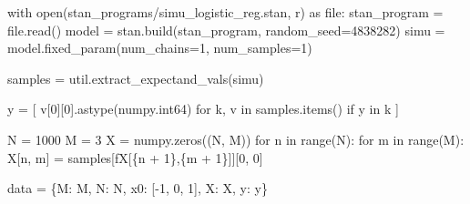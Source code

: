 \documentclass[
  letterpaper,
  DIV=11,
  numbers=noendperiod]{scrartcl}
\newenvironment{Shaded}{\begin{snugshade}}{\end{snugshade}}
\newcommand{\BuiltInTok}[1]{\textcolor[rgb]{0.00,0.23,0.31}{#1}}
\newcommand{\ControlFlowTok}[1]{\textcolor[rgb]{0.00,0.23,0.31}{#1}}
\newcommand{\DecValTok}[1]{\textcolor[rgb]{0.68,0.00,0.00}{#1}}
\newcommand{\ImportTok}[1]{\textcolor[rgb]{0.00,0.46,0.62}{#1}}
\newcommand{\KeywordTok}[1]{\textcolor[rgb]{0.00,0.23,0.31}{#1}}
\newcommand{\NormalTok}[1]{\textcolor[rgb]{0.00,0.23,0.31}{#1}}
\newcommand{\OperatorTok}[1]{\textcolor[rgb]{0.37,0.37,0.37}{#1}}
\newcommand{\SpecialCharTok}[1]{\textcolor[rgb]{0.37,0.37,0.37}{#1}}
\newcommand{\SpecialStringTok}[1]{\textcolor[rgb]{0.13,0.47,0.30}{#1}}
\newcommand{\StringTok}[1]{\textcolor[rgb]{0.13,0.47,0.30}{#1}}
\begin{document}
\begin{Shaded}
\begin{Highlighting}[]
\ControlFlowTok{with} \BuiltInTok{open}\NormalTok{(}\StringTok{\textquotesingle{}stan\_programs/simu\_logistic\_reg.stan\textquotesingle{}}\NormalTok{, }\StringTok{\textquotesingle{}r\textquotesingle{}}\NormalTok{) }\ImportTok{as} \BuiltInTok{file}\NormalTok{:}
\NormalTok{  stan\_program }\OperatorTok{=} \BuiltInTok{file}\NormalTok{.read()}
\NormalTok{model }\OperatorTok{=}\NormalTok{ stan.build(stan\_program, random\_seed}\OperatorTok{=}\DecValTok{4838282}\NormalTok{)}
\NormalTok{simu }\OperatorTok{=}\NormalTok{ model.fixed\_param(num\_chains}\OperatorTok{=}\DecValTok{1}\NormalTok{, num\_samples}\OperatorTok{=}\DecValTok{1}\NormalTok{)}

\NormalTok{samples }\OperatorTok{=}\NormalTok{ util.extract\_expectand\_vals(simu)}

\NormalTok{y }\OperatorTok{=}\NormalTok{ [ v[}\DecValTok{0}\NormalTok{][}\DecValTok{0}\NormalTok{].astype(numpy.int64) }\ControlFlowTok{for}\NormalTok{ k, v }\KeywordTok{in}\NormalTok{ samples.items() }\ControlFlowTok{if} \StringTok{\textquotesingle{}y\textquotesingle{}} \KeywordTok{in}\NormalTok{ k ]}

\NormalTok{N }\OperatorTok{=} \DecValTok{1000}
\NormalTok{M }\OperatorTok{=} \DecValTok{3}
\NormalTok{X }\OperatorTok{=}\NormalTok{ numpy.zeros((N, M))}
\ControlFlowTok{for}\NormalTok{ n }\KeywordTok{in} \BuiltInTok{range}\NormalTok{(N):}
  \ControlFlowTok{for}\NormalTok{ m }\KeywordTok{in} \BuiltInTok{range}\NormalTok{(M):}
\NormalTok{    X[n, m] }\OperatorTok{=}\NormalTok{ samples[}\SpecialStringTok{f\textquotesingle{}X[}\SpecialCharTok{\{}\NormalTok{n }\OperatorTok{+} \DecValTok{1}\SpecialCharTok{\}}\SpecialStringTok{,}\SpecialCharTok{\{}\NormalTok{m }\OperatorTok{+} \DecValTok{1}\SpecialCharTok{\}}\SpecialStringTok{]\textquotesingle{}}\NormalTok{][}\DecValTok{0}\NormalTok{, }\DecValTok{0}\NormalTok{]}

\NormalTok{data }\OperatorTok{=}\NormalTok{ \{}\StringTok{\textquotesingle{}M\textquotesingle{}}\NormalTok{: M, }\StringTok{\textquotesingle{}N\textquotesingle{}}\NormalTok{: N, }\StringTok{\textquotesingle{}x0\textquotesingle{}}\NormalTok{: [}\OperatorTok{{-}}\DecValTok{1}\NormalTok{, }\DecValTok{0}\NormalTok{, }\DecValTok{1}\NormalTok{], }\StringTok{\textquotesingle{}X\textquotesingle{}}\NormalTok{: X, }\StringTok{\textquotesingle{}y\textquotesingle{}}\NormalTok{: y\}}
\end{Highlighting}
\end{Shaded}
\end{document}
